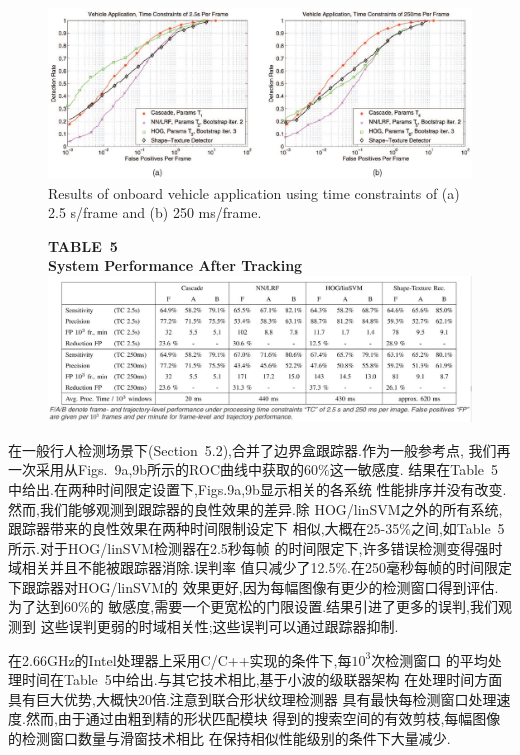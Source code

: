 \documentclass[10pt,letterpaper,journal,compsoc]{IEEEtran}
\begin{document}
\begin{figure}[!t]
\centering
\includegraphics[width=7in]{fig9.JPG}
\caption{Results of onboard vehicle application using time constraints of (a) 2.5 s/frame and (b) 250 ms/frame.
}
\end{figure}
\begin{figure}[!b]
\centering
\large{\textbf{TABLE~5\\
System Performance After Tracking
}}
\includegraphics[width=7in]{table5.JPG}
\end{figure}
在一般行人检测场景下(Section~5.2),合并了边界盒跟踪器.作为一般参考点,
我们再一次采用从Figs.~9a,9b所示的ROC曲线中获取的60\%这一敏感度.
结果在Table~5中给出.在两种时间限定设置下,Figs.9a,9b显示相关的各系统
性能排序并没有改变.然而,我们能够观测到跟踪器的良性效果的差异.除
HOG/linSVM之外的所有系统,跟踪器带来的良性效果在两种时间限制设定下
相似,大概在25-35\%之间,如Table~5所示.对于HOG/linSVM检测器在2.5秒每帧
的时间限定下,许多错误检测变得强时域相关并且不能被跟踪器消除.误判率
值只减少了12.5\%.在250毫秒每帧的时间限定下跟踪器对HOG/linSVM的
效果更好,因为每幅图像有更少的检测窗口得到评估.为了达到60\%的
敏感度,需要一个更宽松的门限设置.结果引进了更多的误判,我们观测到
这些误判更弱的时域相关性;这些误判可以通过跟踪器抑制.

在2.66GHz的Intel处理器上采用C/C++实现的条件下,每$10^3$次检测窗口
的平均处理时间在Table~5中给出.与其它技术相比,基于小波的级联器架构
在处理时间方面具有巨大优势,大概快20倍.注意到联合形状纹理检测器
具有最快每检测窗口处理速度.然而,由于通过由粗到精的形状匹配模块
得到的搜索空间的有效剪枝,每幅图像的检测窗口数量与滑窗技术相比
在保持相似性能级别的条件下大量减少.
\end{document}
